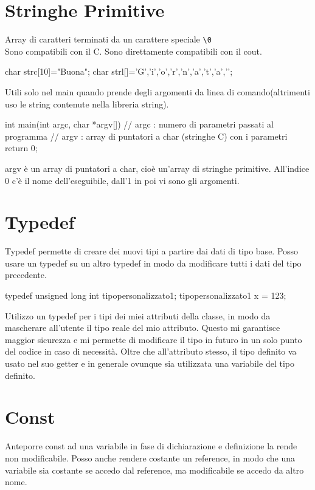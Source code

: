 \section{Stringhe Primitive}
Array di caratteri terminati da un carattere speciale \verb|\0|\\
Sono compatibili con il C. Sono direttamente compatibili con il cout.\\

\begin{cpp}
char strc[10]="Buona"; 
char strl[]={'G','i','o','r','n','a','t','a','\0'}; 
\end{cpp}

Utili solo nel main quando prende degli argomenti da linea di comando(altrimenti uso le string contenute nella libreria string).

\begin{cpp}
int main(int argc, char *argv[])
{
// argc : numero di parametri passati al programma
// argv : array di puntatori a char (stringhe C) con i parametri
return 0;
}
\end{cpp}

argv è un array di puntatori a char, cioè un'array di stringhe primitive. All'indice 0 c'è il nome dell'eseguibile, dall'1 in poi vi sono gli argomenti.

\section{Typedef}
Typedef permette di creare dei nuovi tipi a partire dai dati di tipo base. Posso usare un typedef su un altro typedef in modo da modificare tutti i dati del tipo precedente.

\begin{cpp}
typedef unsigned long int tipopersonalizzato1;
tipopersonalizzato1 x = 123;
\end{cpp}

Utilizzo un typedef per i tipi dei miei attributi della classe, in modo da mascherare all'utente il tipo reale del mio attributo. Questo mi garantisce maggior sicurezza e mi permette di modificare il tipo in futuro in un solo punto del codice in caso di necessità. Oltre che all'attributo stesso, il tipo definito va usato nel suo getter e in generale ovunque sia utilizzata una variabile del tipo definito.

\section{Const}
Anteporre const ad una variabile in fase di dichiarazione e definizione la rende non modificabile. Posso anche rendere costante un reference, in modo che una variabile sia costante se accedo dal reference, ma modificabile se accedo da altro nome.


